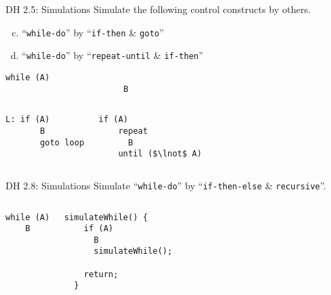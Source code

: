 \begin{frame}[fragile]{}
  \begin{exampleblock}{DH 2.5: Simulations}
    Simulate the following control constructs by others.
    \begin{enumerate}[(a)]
      \setcounter{enumi}{(2)}
      \item ``\texttt{while-do}'' by ``\texttt{if-then} \& \texttt{goto}''
      \item ``\texttt{while-do}'' by ``\texttt{repeat-until} \& \texttt{if-then}''
    \end{enumerate}
  \end{exampleblock}

  \begin{lstlisting}[style = Cstyle, backgroundcolor = \color{teal!10!lightgray}]
                      while (A)
                        B
  \end{lstlisting}

  \begin{columns}
      \pause
      \begin{lstlisting}[style = Cstyle]
  L: if (A)
       B
       goto loop
      \end{lstlisting}
      \pause
      \begin{lstlisting}[style = Cstyle]
  if (A)
    repeat
      B
    until ($\lnot$ A)
      \end{lstlisting}
  \end{columns}
\end{frame}

\begin{frame}[fragile]{}
  \begin{exampleblock}{DH 2.8: Simulations}
    Simulate ``\texttt{while-do}'' by ``\texttt{if-then-else} \& \texttt{recursive}''.
  \end{exampleblock}

  \begin{columns}
      \begin{lstlisting}[style = Cstyle, backgroundcolor = \color{teal!10!lightgray}]
  while (A)
    B
      \end{lstlisting}
      \pause
      \begin{lstlisting}[style = Cstyle]
  simulateWhile() {
    if (A)
      B
      simulateWhile();

    return;
  }
      \end{lstlisting}
  \end{columns}
\end{frame}

